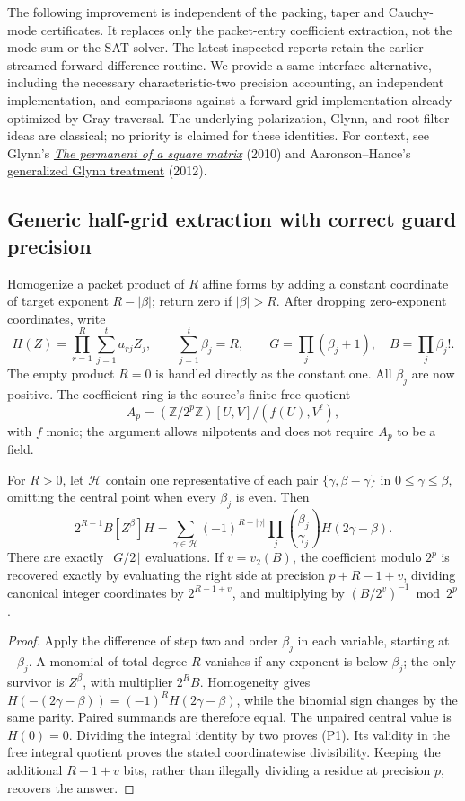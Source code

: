 The following improvement is independent of the packing, taper and Cauchy-mode
certificates. It replaces only the packet-entry coefficient extraction, not the
mode sum or the SAT solver. The latest inspected reports retain the earlier
streamed forward-difference routine. We provide a same-interface alternative,
including the necessary characteristic-two precision accounting, an independent
implementation, and comparisons against a forward-grid implementation already
optimized by Gray traversal. The underlying polarization, Glynn, and root-filter
ideas are classical; no priority is claimed for these identities. For context,
see Glynn's \href{https://doi.org/10.1016/j.ejc.2010.01.010}{\emph{The permanent of a
square matrix}} (2010) and Aaronson--Hance's
\href{https://arxiv.org/abs/1212.0025}{generalized Glynn treatment} (2012).

\subsection{Generic half-grid extraction with correct guard precision}
Homogenize a packet product of $R$ affine forms by adding a constant coordinate
of target exponent $R-|\beta|$; return zero if $|\beta|>R$. After dropping
zero-exponent coordinates, write
\[
 H(Z)=\prod_{r=1}^{R}\sum_{j=1}^{t}a_{rj}Z_j,
 \qquad \sum_{j=1}^t\beta_j=R,
 \qquad G=\prod_j(\beta_j+1),\quad B=\prod_j\beta_j!.
\]
The empty product $R=0$ is handled directly as the constant one. All $\beta_j$ are now positive. The coefficient ring is the source's finite free quotient
\[ A_p=(\mathbb Z/2^p\mathbb Z)[U,V]/(f(U),V^\ell), \]
with $f$ monic;
the argument allows nilpotents and does not require $A_p$ to be a field.

\begin{proposition}
For $R>0$, let $\mathcal H$ contain one representative of each pair
$\{\gamma,\beta-\gamma\}$ in $0\le\gamma\le\beta$, omitting the central point
when every $\beta_j$ is even. Then
\[
 2^{R-1}B[Z^\beta]H
 =\sum_{\gamma\in\mathcal H}
 (-1)^{R-|\gamma|}\prod_j\binom{\beta_j}{\gamma_j}
 H(2\gamma-\beta).                                      \tag{P1}
\]
There are exactly $\lfloor G/2\rfloor$ evaluations. If $v=v_2(B)$, the
coefficient modulo $2^p$ is recovered exactly by evaluating the right side at
precision $p+R-1+v$, dividing canonical integer coordinates by $2^{R-1+v}$,
and multiplying by $(B/2^v)^{-1}\bmod2^p$.
\end{proposition}
\begin{proof}
Apply the difference of step two and order $\beta_j$ in each variable, starting
at $-\beta_j$. A monomial of total degree $R$ vanishes if any exponent is below
$\beta_j$; the only survivor is $Z^\beta$, with multiplier $2^RB$.
Homogeneity gives $H(-(2\gamma-\beta))=(-1)^RH(2\gamma-\beta)$, while the
binomial sign changes by the same parity. Paired summands are therefore equal.
The unpaired central value is $H(0)=0$. Dividing the integral identity by two
proves (P1). Its validity in the free integral quotient proves the stated
coordinatewise divisibility. Keeping the additional $R-1+v$ bits, rather than
illegally dividing a residue at precision $p$, recovers the answer.
\end{proof}

